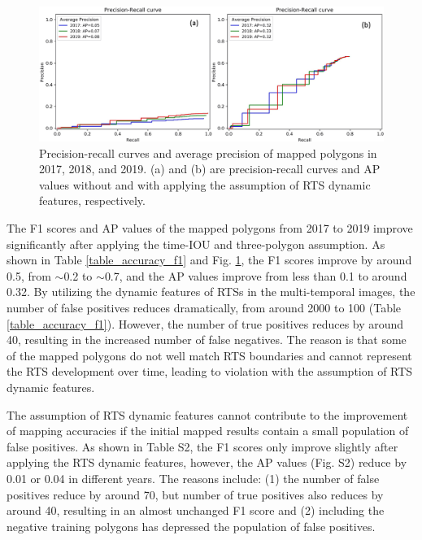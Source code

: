 \documentclass[authoryear,preprint,review,12pt]{elsarticle}
\begin{document}
\begin{figure} 
	\centering
	\includegraphics[width=14cm]{figs/exp7_p_r_curves_trim.jpg}
	\caption{Precision-recall curves and average precision of mapped polygons in 2017, 2018, and 2019. (a) and (b) are precision-recall curves and AP values without and with applying the assumption of RTS dynamic features, respectively.}
	\label{fig_p_r_curve_exp7}
\end{figure}


The F1 scores and AP values of the mapped polygons from 2017 to 2019 improve significantly after applying the time-IOU and three-polygon assumption. 
As shown in Table \ref{table_accuracy_f1} and Fig. \ref{fig_p_r_curve_exp7}, the F1 scores improve by around 0.5, from $\sim$0.2 to $\sim$0.7, and the AP values improve from less than 0.1 to around 0.32. 
By utilizing the dynamic features of RTSs in the multi-temporal images, the number of false positives reduces dramatically, from around 2000 to 100 (Table \ref{table_accuracy_f1}).
However, the number of true positives reduces by around 40, resulting in the increased number of false negatives. 
The reason is that some of the mapped polygons do not well match RTS boundaries and cannot represent the RTS development over time, leading to violation with the assumption of RTS dynamic features. 
 
The assumption of RTS dynamic features cannot contribute to the improvement of mapping accuracies if the initial mapped results contain a small population of false positives. 
As shown in Table S2, the F1 scores only improve slightly after applying the RTS dynamic features, however, the AP values (Fig. S2) reduce by 0.01 or 0.04 in different years.   
The reasons include: (1) the number of false positives reduce by around 70, but number of true positives also reduces by around 40, resulting in an almost unchanged F1 score 
and (2) including the negative training polygons %
 has depressed the population of false positives. 
\end{document}
